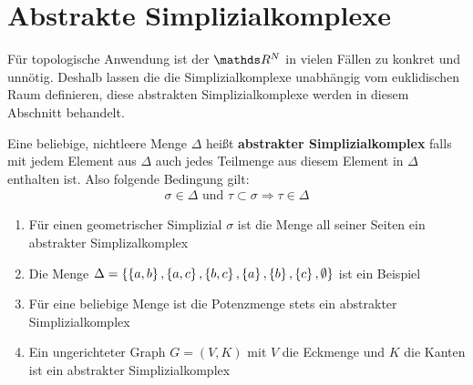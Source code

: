 
\section{Abstrakte Simplizialkomplexe}

Für topologische Anwendung ist der $\R^N$ in vielen Fällen zu konkret und 
unnötig. Deshalb lassen die die Simplizialkomplexe unabhängig vom 
euklidischen Raum definieren, diese abstrakten Simplizialkomplexe 
werden in diesem Abschnitt behandelt.

\begin{Def}
	Eine beliebige, nichtleere Menge $\Delta$ heißt \textbf{abstrakter Simplizialkomplex}
	falls mit jedem Element aus $\Delta$ auch jedes Teilmenge aus diesem Element in $\Delta$
	enthalten ist. Also folgende Bedingung gilt:
	\begin{gather*}
		\sigma \in \Delta \text{ und } \tau \subset \sigma \Rightarrow \tau \in \Delta
	\end{gather*}
\end{Def}

\begin{Bsp}
	\begin{enumerate}[\textbullet]
		\item Für einen geometrischer Simplizial $\sigma$ ist die Menge
			all seiner Seiten ein abstrakter Simplizalkomplex
		\item Die Menge $\Delta = \sset{%
			 \sset{a,b},\sset{a,c},%
			 \sset{b,c},\sset{a},\sset{b},\sset{c},\emptyset}$ ist ein Beispiel
		\item Für eine beliebige Menge ist die Potenzmenge stets ein abstrakter
			Simplizialkomplex
		\item Ein ungerichteter Graph $G=(V,K)$ mit $V$ die Eckmenge und $K$ die Kanten ist ein abstrakter Simplizialkomplex
	\end{enumerate}
\end{Bsp}

















